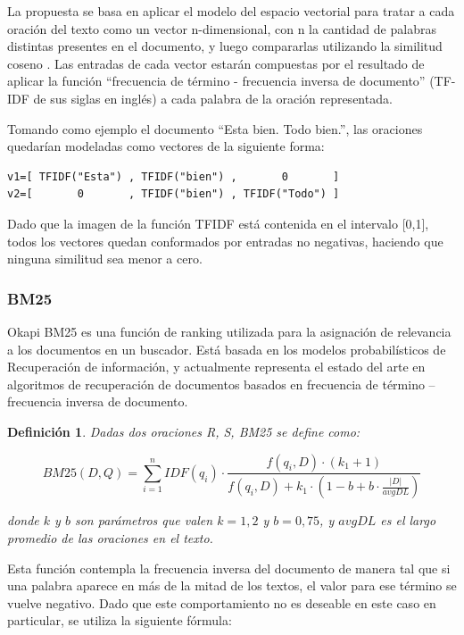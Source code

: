 \documentclass[a4paper]{article}
\newtheorem{definicion}{Definición}
\begin{document}
La propuesta se basa en aplicar el modelo del espacio vectorial para tratar a cada oración del texto como un vector n-dimensional, con n la cantidad de palabras distintas presentes en el documento, y luego compararlas utilizando la similitud coseno . Las entradas de cada vector estarán compuestas por el resultado de aplicar la función “frecuencia de término - frecuencia inversa de documento” (TF-IDF de sus siglas en inglés) a cada palabra de la oración representada.

Tomando como ejemplo el documento “Esta bien. Todo bien.”, las oraciones quedarían modeladas como vectores de la siguiente forma:

\begin{Verbatim}[xleftmargin=3em]
v1=[ TFIDF("Esta") , TFIDF("bien") ,       0       ]
v2=[       0       , TFIDF("bien") , TFIDF("Todo") ]
\end{Verbatim}

Dado que la imagen de la función TFIDF está contenida en el intervalo [0,1], todos los vectores quedan conformados por entradas no negativas, haciendo que ninguna similitud sea menor a cero. 


\subsubsection{BM25}
Okapi BM25 es una función de ranking utilizada para la asignación de relevancia a los documentos en un buscador. 
Está basada en los modelos probabilísticos de Recuperación de información, y actualmente 
representa el estado del arte en algoritmos de recuperación de documentos 
basados en frecuencia de término -- frecuencia inversa de documento.

\begin{definicion}
Dadas dos oraciones R, S, BM25 se define como:

\begin{equation}
BM25(D,Q) = \sum_{i=1}^{n} IDF(q_i) \cdot \frac{f(q_i, D) \cdot (k_1 + 1)}{f(q_i, D) + k_1 \cdot (1 - b + b \cdot \frac{|D|}{avgDL})}
\end{equation}

donde $k$ y $b$ son parámetros que valen $k = 1,2$ y $b = 0,75$, y $avgDL$ es el largo promedio de las oraciones en el texto.
\end{definicion}

Esta función contempla la frecuencia inversa del documento de manera tal que si una palabra aparece en más de la mitad de los textos, el valor para ese término se vuelve negativo. Dado que este comportamiento no es deseable en este caso en particular, se utiliza la siguiente fórmula:
                
\end{document}
